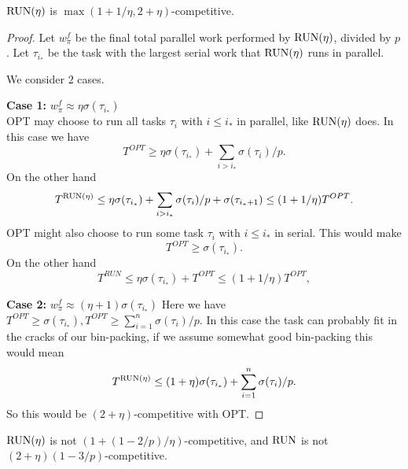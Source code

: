 \begin{proposition}
  \label{prop:runetaupper}
  $\operatorname{\text{RUN}}(\eta)$ is $\max(1+1/\eta, 2+\eta)$-competitive.
\end{proposition}
\begin{proof}
    Let $w_\pi^f$ be the final total parallel work performed by
    $\operatorname{\text{RUN}}(\eta)$, divided by $p$. Let $\tau_{i_*}$ be the task
    with the largest serial work that $\operatorname{\text{RUN}}(\eta)$ runs in
    parallel.

    We consider $2$ cases.

  \noindent\textbf{Case 1:} $w_\pi^f \approx \eta \sigma(\tau_{i_*})$\\
    OPT may choose to run all tasks $\tau_i$ with $i \le i_*$ in
    parallel, like $\operatorname{\text{RUN}}(\eta)$ does. In this case we have
    $$T^{OPT} \ge \eta \sigma(\tau_{i_*}) + \sum_{i>i_*}
    \sigma(\tau_i)/p.$$
    On the other hand 
    $$T^{\operatorname{\text{RUN}}(\eta)} \le \eta \sigma(\tau_{i_*}) + \sum_{i>i_*}
    \sigma(\tau_i)/p + \sigma(\tau_{i_*+1}) \le
    (1+1/\eta)T^{OPT}.$$
    OPT might also choose to run some task $\tau_i$ with $i
    \le i_* $ in serial. This would make
    $$T^{OPT} \ge \sigma(\tau_{i_*}).$$
    On the other hand 
    $$T^{RUN} \le \eta \sigma(\tau_{i_*}) + T^{OPT} \le
    (1+1/\eta)T^{OPT},$$

    \noindent\textbf{Case 2:} $w_\pi^f \approx (\eta+1) \sigma(\tau_{i_*})$
    Here we have $T^{OPT} \ge \sigma(\tau_{i_*}), T^{OPT} \ge
    \sum_{i=1}^n \sigma(\tau_i)/p$.
    In this case the task can probably fit in the cracks of our
    bin-packing, if we assume somewhat good bin-packing this
    would mean 
    $$T^{\operatorname{\text{RUN}}(\eta)} \le (1+\eta)\sigma(\tau_{i_*}) +
    \sum_{i=1}^n \sigma(\tau_i)/p.$$
    So this would be $(2+\eta)$-competitive with OPT.
\end{proof}
\begin{proposition}
  \label{prop:runetalower}
  $\operatorname{\text{RUN}}(\eta)$ is not $(1 + (1-2/p)/\eta)$-competitive, and $\operatorname{\text{RUN}}$ is
  not $(2+\eta)(1-3/p)$-competitive.
\end{proposition}
